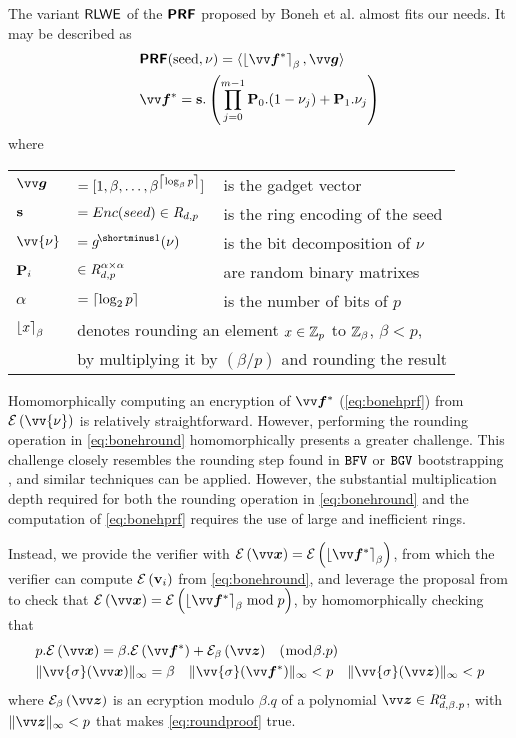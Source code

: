 The variant $\textsf{RLWE}$ of the $\textsf{\textbf{PRF}}$ proposed by Boneh et al. \cite{bonehKeyHomomorphicPRFs2013} almost fits our needs. It may be described as
\begin{align}
&\PRF(\textrm{seed},\nu)= \inprod{\round{\pv{f}^*}_{\beta}}{\pv{g}} \label{eq:bonehround}\\
&\pv{f}^* = \ps.\left(\prod_{j=0}^{m-1} \mP_0.(1-\nu_j) + \mP_1.\nu_j\right) \label{eq:bonehprf}
\end{align}
where

\begin{tabular}{lll}
$\pv{g}$ &$= [1,\beta,\ldots,\beta^{\left\lceil \log_{\beta} p \right\rceil}]$ &\small{is the gadget vector}\\
$\mathbf{s}$ &$= Enc(seed) \in \mathit{R}_{d,p}$ &\small{is the ring encoding of the seed}\\
$\vv{\nu}$ &$= \inv{g}(\nu)$ &\small{is the bit decomposition of $\nu$}\\
$\mathbf{P}_i$ &$\in \mathit{R}^{\alpha\times\alpha}_{d,p}$ &\small{are random binary matrixes}\\
$\alpha$ &$= \left\lceil \log_2 p \right\rceil$ &\small{is the number of bits of $p$}\\
$\left\lfloor x \right\rceil_{\beta}$ &\multicolumn{2}{l}{\small{denotes rounding an element $x \in \mathbb{Z}_p$ to $\mathbb{Z}_{\beta}$, $\beta<p$,}}\\
&\multicolumn{2}{l}{\small{by multiplying it by $(\beta/p)$ and rounding the result}}
\end{tabular}

Homomorphically computing an encryption of $\pv{f}^*$ (\cref{eq:bonehprf}) from $\enc{\vv{\nu}}$ is relatively straightforward. However, performing the rounding operation in \cref{eq:bonehround} homomorphically presents a greater challenge. This challenge closely resembles the rounding step found in $\mathtt{BFV}$ or $\mathtt{BGV}$ bootstrapping \cite{gentryBetterBootstrappingFully2012}, and similar techniques can be applied. However, the substantial multiplication depth required for both the rounding operation in \cref{eq:bonehround} and the computation of \cref{eq:bonehprf} requires the use of large and inefficient rings.

Instead, we provide the verifier with $\enc{\pv{x}}=\enc{\round{\pv{f}^*}_{\beta}}$, from which the verifier can compute $\mathcal{E}\left({\mathbf{v}_i}\right)$ from \cref{eq:bonehround}, and leverage the proposal from \cite{libertZeroKnowledgeArgumentsLatticeBased2017} to check that $\enc{\pv{x}}=\enc{\round{\pv{f}^*}_{\beta} \bmod p}$, by homomorphically checking that
\begin{align}\label{eq:roundproof}
&p.\enc{\pv{x}}=\beta.\enc{\pv{f}^*}+\senc{\pv{z}}{\beta} \;\;\;(\bmod \beta.p)\\
&\|\vv{\sigma}(\pv{x})\|_{\infty}=\beta \quad \|\vv{\sigma}(\pv{f}^*)\|_{\infty}<p  \quad \|\vv{\sigma}(\pv{z})\|_{\infty}<p \label{eq:normproof}
\end{align}
where $\senc{\pv{z}}{\beta}$ is an ecryption modulo $\beta.q$ of a polynomial $\pv{z} \in \intring^{\alpha}_{d,\beta.p}$, with $\|\pv{z}\|_{\infty}< p$ that makes \cref{eq:roundproof} true.

